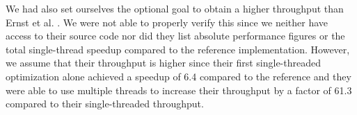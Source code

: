 We had also set ourselves the optional goal to obtain a higher throughput than Ernst et al. \cite{ernst2020Performance}. We were not able to properly verify this since we neither have access to their source code nor did they list absolute performance figures or the total single-thread speedup compared to the reference implementation. However, we assume that their throughput is higher since their first single-threaded optimization alone achieved a speedup of 6.4 compared to the reference and they were able to use multiple threads to increase their throughput by a factor of 61.3 compared to their single-threaded throughput.
